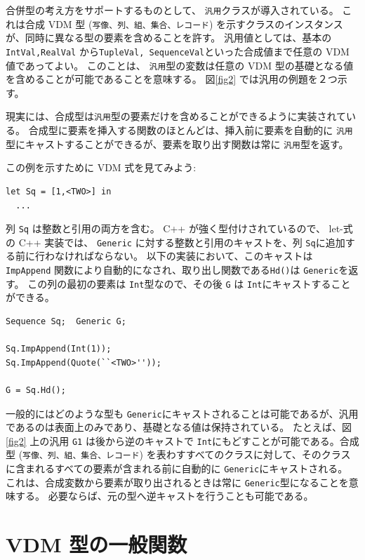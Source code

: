 \documentclass[\pformat,12pt]{jarticle}
\begin{document}
合併型の考え方をサポートするものとして、 {\tt 汎用}クラスが導入されている。
これは合成 VDM 型 ({\tt 写像、列、組、集合、レコード}) を示すクラスのインスタンスが、同時に異なる型の要素を含めることを許す。
汎用値としては、基本の{\tt IntVal,RealVal} から{\tt TupleVal, SequenceVal}といった合成値まで任意の VDM 値であってよい。
このことは、 {\tt 汎用}型の変数は任意の VDM 型の基礎となる値を含めることが可能であることを意味する。
図\ref{fig2} では汎用の例題を２つ示す。

現実には、合成型は{\tt 汎用}型の要素だけを含めることができるように実装されている。
合成型に要素を挿入する関数のほとんどは、挿入前に要素を自動的に {\tt 汎用}型にキャストすることができるが、要素を取り出す関数は常に {\tt 汎用}型を返す。

この例を示すために VDM 式を見てみよう:

\begin{verbatim}
let Sq = [1,<TWO>] in
  ...
\end{verbatim}

列 {\tt Sq} は整数と引用の両方を含む。
 C++ が強く型付けされているので、 let-式の C++ 実装では、 {\tt Generic} に対する整数と引用のキャストを、列 {\tt Sq}に追加する前に行わなければならない。
以下の実装において、このキャストは {\tt ImpAppend} 関数により自動的になされ、取り出し関数である{\tt Hd()}は {\tt Generic}を返す。 
この列の最初の要素は {\tt Int}型なので、その後 {\tt G} は {\tt Int}にキャストすることができる。 

\begin{verbatim}
Sequence Sq;  Generic G;

Sq.ImpAppend(Int(1)); 
Sq.ImpAppend(Quote(``<TWO>''));

G = Sq.Hd();
\end{verbatim}

一般的にはどのような型も {\tt Generic}にキャストされることは可能であるが、汎用であるのは表面上のみであり、基礎となる値は保持されている。
たとえば、図\ref{fig2} 上の汎用 {\tt G1} は後から逆のキャストで {\tt Int}にもどすことが可能である。合成型 ({\tt 写像、列、組、集合、レコード}) を表わすすべてのクラスに対して、そのクラスに含まれるすべての要素が含まれる前に自動的に {\tt Generic}にキャストされる。
これは、合成変数から要素が取り出されるときは常に {\tt Generic}型になることを意味する。
必要ならば、元の型へ逆キャストを行うことも可能である。


\section{VDM 型の一般関数} 
\label{general-op}
\end{document}
